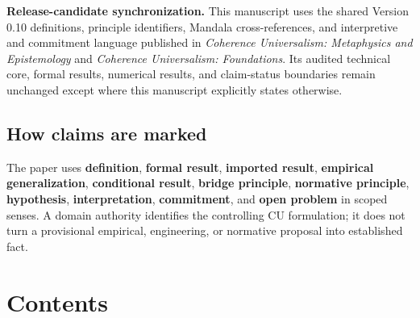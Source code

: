 \documentclass[
  11pt,
]{article}
\begin{document}
\textbf{Release-candidate synchronization.} This manuscript uses the
shared Version 0.10 definitions, principle identifiers, Mandala
cross-references, and interpretive and commitment language published in
\emph{Coherence Universalism: Metaphysics and Epistemology} and
\emph{Coherence Universalism: Foundations}. Its audited technical core,
formal results, numerical results, and claim-status boundaries remain
unchanged except where this manuscript explicitly states otherwise.

\subsection{How claims are marked}\label{how-claims-are-marked}

The paper uses \textbf{definition}, \textbf{formal result},
\textbf{imported result}, \textbf{empirical generalization},
\textbf{conditional result}, \textbf{bridge principle},
\textbf{normative principle}, \textbf{hypothesis},
\textbf{interpretation}, \textbf{commitment}, and \textbf{open problem}
in scoped senses. A domain authority identifies the controlling CU
formulation; it does not turn a provisional empirical, engineering, or
normative proposal into established fact.

\section{Contents}\label{contents}
\end{document}
